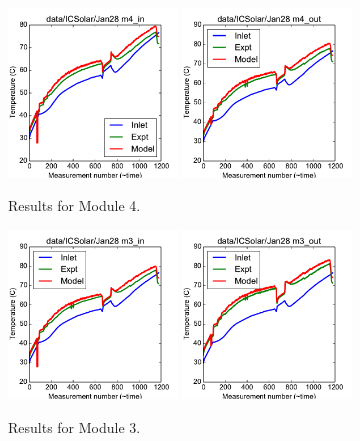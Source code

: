 \documentclass{article}
\begin{document}
\clearpage
\begin{figure}[!ht]
\centering
\includegraphics[width=0.4\textwidth]{../../data/ICSolar/images/Jan28_m4_in.pdf}\hspace{0.05\textwidth}
\includegraphics[width=0.4\textwidth]{../../data/ICSolar/images/Jan28_m4_out.pdf}\hspace{0.05\textwidth}\\
\caption{Results for Module 4.}\end{figure}
\begin{figure}[!ht]
\centering
\includegraphics[width=0.4\textwidth]{../../data/ICSolar/images/Jan28_m3_in.pdf}\hspace{0.05\textwidth}
\includegraphics[width=0.4\textwidth]{../../data/ICSolar/images/Jan28_m3_out.pdf}\hspace{0.05\textwidth}\\
\caption{Results for Module 3.}\end{figure}
\end{document}
